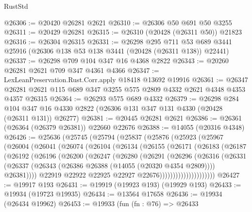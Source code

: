 \begin{lexlean}{RustStd}
\begin{coremodule}
@26306 := @20420 @26281 @2621
@26310 := @26306 @50 @691 @50 @3255
@26311 := @20429 @26281
@26315 := @26310 (@20428 (@26311 @50)) @21823
@26316 := @26304 @26315
@26331 := @26298
    @295
    @711
    @53
    @689
    @3441
    @25916
    (@26306 @138 @53 @138 @3441 (@20428 (@26311 @138)) @22441)
@26337 := @26298 @709 @104 @347 @16 @4368 @2822
@26343 := @20260 @26281 @2621 @709 @347 @4361 @4366
@26347 := LexLeanPreservation.Rust.Corr.apply @18418 @13692 @19916
@26361 := @26347 @26281 @2621 @115 @689 @347 @3255 @575 @2809 @4332 @2621 @4348 @4353 @4357 @26315
@26364 := @26293 @575 @689 @4332
@26379 := @26298
    @284
    @104
    @347
    @16
    @4330
    @2822
    (@26306 @131 @347 @131 @4330 (@20428 (@26311 @131)) @26277)
@26381 := @20445 @26281 @2621
@26386 := @26361 (@26364 (@26379 @26381)) @22660 @22676
@26388 := @14055 (@20316 @4348)
@26426 := @25636
    (@25745
      (@25794
        (@25837
          (@25876
            (@25923
              (@25967
                (@26004
                  (@26041
                    (@26074
                      (@26104
                        (@26134
                          (@26155
                            (@26171
                              (@26183
                                (@26187
                                  (@26192
                                    (@26196
                                      (@26200
                                        (@26247
                                          (@26280
                                            (@26291
                                              (@26296
                                                (@26316
                                                  (@26331
                                                    (@26337
                                                      (@26343
                                                        (@26386
                                                          @26388
                                                          (@14055 (@20320 @4354 @2809))))
                                                      @26381))))
                                              @22919
                                              @22922
                                              @22925
                                              @22927
                                              @22676)))))))))))))))))))))
@26427 := @19917 @193
@26431 := @19919 (@19923 @193) (@19929 @193)
@26433 := @19934 (@19723 @19935)
@26434 := @13564 @17658
@26436 := @19934 (@26434 @19962)
@26453 := @19933
    (fun (fn : @76) =>
    @26433

\end{coremodule}
\end{lexlean}
